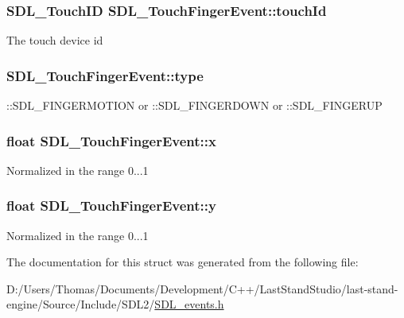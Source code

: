 \subsubsection[{touch\+Id}]{\setlength{\rightskip}{0pt plus 5cm}S\+D\+L\+\_\+\+Touch\+I\+D S\+D\+L\+\_\+\+Touch\+Finger\+Event\+::touch\+Id}\label{structSDL__TouchFingerEvent_ad7a6f39ec9af1bf47b160d18314edd70}
The touch device id \hypertarget{structSDL__TouchFingerEvent_a3883218fa3426065ca66086c100edbfa}{}
\subsubsection[{type}]{ S\+D\+L\+\_\+\+Touch\+Finger\+Event\+::type}\label{structSDL__TouchFingerEvent_a3883218fa3426065ca66086c100edbfa}
\+::\+S\+D\+L\+\_\+\+F\+I\+N\+G\+E\+R\+M\+O\+T\+I\+O\+N or \+::\+S\+D\+L\+\_\+\+F\+I\+N\+G\+E\+R\+D\+O\+W\+N or \+::\+S\+D\+L\+\_\+\+F\+I\+N\+G\+E\+R\+U\+P \hypertarget{structSDL__TouchFingerEvent_a0ce44b1342220fa17e9b9b4a77c2c906}{}
\subsubsection[{x}]{\setlength{\rightskip}{0pt plus 5cm}float S\+D\+L\+\_\+\+Touch\+Finger\+Event\+::x}\label{structSDL__TouchFingerEvent_a0ce44b1342220fa17e9b9b4a77c2c906}
Normalized in the range 0...1 \hypertarget{structSDL__TouchFingerEvent_ac2bb8af638d2927a8e13f6ffe8f9384e}{}
\subsubsection[{y}]{\setlength{\rightskip}{0pt plus 5cm}float S\+D\+L\+\_\+\+Touch\+Finger\+Event\+::y}\label{structSDL__TouchFingerEvent_ac2bb8af638d2927a8e13f6ffe8f9384e}
Normalized in the range 0...1 

The documentation for this struct was generated from the following file\+:\begin{DoxyCompactItemize}
\item 
D\+:/\+Users/\+Thomas/\+Documents/\+Development/\+C++/\+Last\+Stand\+Studio/last-\/stand-\/engine/\+Source/\+Include/\+S\+D\+L2/\hyperlink{SDL__events_8h}{S\+D\+L\+\_\+events.\+h}\end{DoxyCompactItemize}
